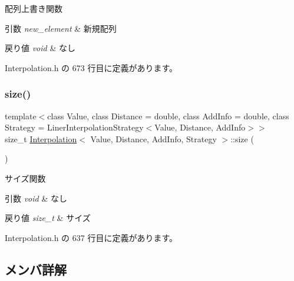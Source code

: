 配列上書き関数 


\begin{DoxyParams}{引数}
{\em new\+\_\+element} & 新規配列 \\
\hline
\end{DoxyParams}

\begin{DoxyRetVals}{戻り値}
{\em void} & なし \\
\hline
\end{DoxyRetVals}


 Interpolation.\+h の 673 行目に定義があります。

\mbox{\label{class_interpolation_a578f14e07599bb0673af9006d21d8d94}} 
\subsubsection{\texorpdfstring{size()}{size()}}
{\footnotesize\ttfamily template$<$class Value, class Distance = double, class Add\+Info = double, class Strategy = Liner\+Interpolation\+Strategy$<$\+Value, Distance, Add\+Info$>$$>$ \\
size\+\_\+t \mbox{\hyperlink{class_interpolation}{Interpolation}}$<$ Value, Distance, Add\+Info, Strategy $>$\+::size (\begin{DoxyParamCaption}{ }\end{DoxyParamCaption})\hspace{0.3cm}{\ttfamily [inline]}}



サイズ関数 


\begin{DoxyParams}{引数}
{\em void} & なし \\
\hline
\end{DoxyParams}

\begin{DoxyRetVals}{戻り値}
{\em size\+\_\+t} & サイズ \\
\hline
\end{DoxyRetVals}


 Interpolation.\+h の 637 行目に定義があります。



\subsection{メンバ詳解}
\mbox{\label{class_interpolation_a2cf1221d1c0f8770231e61ad7b64a26d}} 
